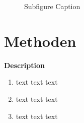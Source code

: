 \begin{figure}[htbp] 
	\centering
	\caption{Subfigure Caption}
	\label{fig:figure1}
\end{figure} 

\pagebreak

\section{Methoden}


\begin{description}
\item \textbf{Description}
\begin{enumerate}
\item text text text
\item text text text
\item text text text
\end{enumerate}
\end{description}


